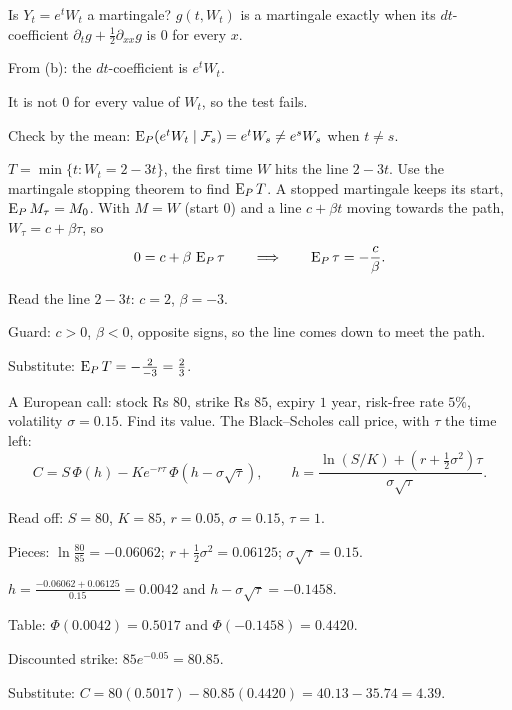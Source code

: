 \begin{problem}[Q1(c)]
Is $Y_t=e^tW_t$ a martingale?
\cardsays $g(t,W_t)$ is a martingale exactly when its $dt$-coefficient $\partial_tg+\frac12\partial_{xx}g$ is $0$ for every $x$.
\working
\begin{steps}
\item From (b): the $dt$-coefficient is $e^tW_t$.
\item It is not $0$ for every value of $W_t$, so the test fails.
\item Check by the mean: $\operatorname{E}_P(e^tW_t\mid\mathcal F_s)=e^tW_s\ne e^sW_s$ when $t\ne s$.
\end{steps}
\end{problem}

\begin{problem}[Q1(d)]
$T=\min\{t:W_t=2-3t\}$, the first time $W$ hits the line $2-3t$. Use the martingale stopping theorem to find $\operatorname{E}_PT$.
\cardsays A stopped martingale keeps its start, $\operatorname{E}_PM_\tau=M_0$. With $M=W$ (start $0$) and a line $c+\beta t$ moving towards the path, $W_\tau=c+\beta\tau$, so
\[
0=c+\beta\,\operatorname{E}_P\tau\qquad\Longrightarrow\qquad\operatorname{E}_P\tau=-\frac c\beta.
\]
\working
\begin{steps}
\item Read the line $2-3t$: $c=2$, $\beta=-3$.
\item Guard: $c>0$, $\beta<0$, opposite signs, so the line comes down to meet the path.
\item Substitute: $\operatorname{E}_PT=-\frac{2}{-3}=\frac23$.
\end{steps}
\end{problem}

\begin{problem}[Q1(e)]
A European call: stock Rs $80$, strike Rs $85$, expiry $1$ year, risk-free rate $5\%$, volatility $\sigma=0.15$. Find its value.
\cardsays The Black--Scholes call price, with $\tau$ the time left:
\[
C=S\,\Phi(h)-Ke^{-r\tau}\,\Phi(h-\sigma\sqrt\tau),\qquad h=\frac{\ln(S/K)+(r+\frac12\sigma^2)\tau}{\sigma\sqrt\tau}.
\]
\working
\begin{steps}
\item Read off: $S=80$, $K=85$, $r=0.05$, $\sigma=0.15$, $\tau=1$.
\item Pieces: $\ln\frac{80}{85}=-0.06062$; $r+\frac12\sigma^2=0.06125$; $\sigma\sqrt\tau=0.15$.
\item $h=\frac{-0.06062+0.06125}{0.15}=0.0042$ and $h-\sigma\sqrt\tau=-0.1458$.
\item Table: $\Phi(0.0042)=0.5017$ and $\Phi(-0.1458)=0.4420$.
\item Discounted strike: $85e^{-0.05}=80.85$.
\item Substitute: $C=80(0.5017)-80.85(0.4420)=40.13-35.74=4.39$.
\end{steps}
\end{problem}

